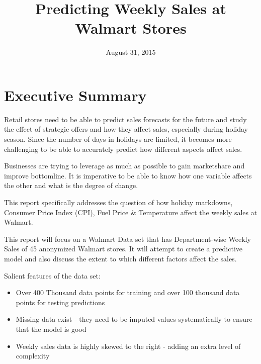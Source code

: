 \documentclass[]{article}
\title{Predicting Weekly Sales at Walmart Stores}
\author{}
\date{August 31, 2015}
\begin{document}
\maketitle


{
\hypersetup{linkcolor=black}
\setcounter{tocdepth}{3}
\tableofcontents
}
\pagebreak
\hfill \break
\hfill \break
\hfill \break
\hfill \break
\hfill \break
\hfill \break
\hfill \break
\hfill \break
\hfill \break
\hfill \break
\hfill \break
\hfill \break
\hfill \break
\hfill \break
\hfill \break
\hfill \break
\hfill \break
\hfill \break
\hfill \break
\hfill \break

\section{Executive Summary}\label{executive-summary}

Retail stores need to be able to predict sales forecasts for the future
and study the effect of strategic offers and how they affect sales,
especially during holiday season. Since the number of days in holidays
are limited, it becomes more challenging to be able to accurately
predict how different aspects affect sales.

Businesses are trying to leverage as much as possible to gain
marketshare and improve bottomline. It is imperative to be able to know
how one variable affects the other and what is the degree of change.

This report specifically addresses the question of how holiday
markdowns, Consumer Price Index (CPI), Fuel Price \& Temperature affect
the weekly sales at Walmart.

This report will focus on a Walmart Data set that has Department-wise
Weekly Sales of 45 anonymized Walmart stores. It will attempt to create
a predictive model and also discuss the extent to which different
factors affect the sales.

Salient features of the data set:

\begin{itemize}
\itemsep1pt\parskip0pt
\item
  Over 400 Thousand data points for training and over 100 thousand data
  points for testing predictions
\item
  Missing data exist - they need to be imputed values systematically to
  ensure that the model is good
\item
  Weekly sales data is highly skewed to the right - adding an extra
  level of complexity
\end{itemize}
\end{document}
